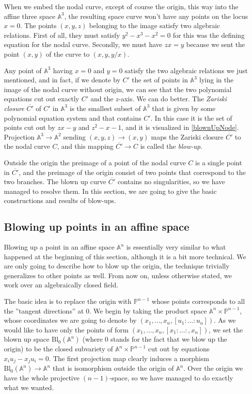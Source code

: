 \documentclass[12pt,a4paper,leqno]{article}
\newcommand{\Aff}{\mathbb{A}}
\newcommand{\Proj}{\mathbb{P}}
\newcommand{\bl}{\mathrm{Bl}}
\newcommand{\fref}[1]{\hyperref[{#1}]{\ref*{#1}}}
\theoremstyle{plain}
\theoremstyle{definition}
\theoremstyle{remark}
\begin{document}
When we embed the nodal curve, except of course the origin, this way into the affine three space $\Aff^3$, the resulting space curve won't have any points on the locus $x=0$. The points $(x,y,z)$ belonging to the image satisfy two algebraic relations. First of all, they must satisfy $y^2 - x^3 - x^2 = 0$ for this was the defining equation for the nodal curve. Secondly, we must have $zx = y$ because we sent the point $(x,y)$ of the curve to $(x,y,y/x)$.

Any point of $\Aff^3$ having $x=0$ and $y=0$ satisfy the two algebraic relations we just mentioned, and in fact, if we denote by $C'$ the set of points in $\Aff^3$ lying in the image of the nodal curve without origin, we can see that the two polynomial equations cut out exactly $C'$ and the $z$-axis. We can do better. The \emph{Zariski closure} $\overline{C'}$ of $C'$ in $\Aff^3$ is the smallest subset of $\Aff^3$ that is given by some polynomial equation system and that contains $C'$. In this case it is the set of points cut out by $zx - y$ and $z^2 - x - 1$, and it is visualized in \fref{blownUpNode}. Projection $\Aff ^3 \to \Aff^2$ sending $(x,y,z) \to (x,y)$ maps the Zariski closure $\overline{C'}$ to the nodal curve $C$, and this mapping $\overline{C'} \to C$ is called the \emph{blow-up}.

Outside the origin the preimage of a point of the nodal curve $C$ is a single point in $\overline{C'}$, and the preimage of the origin consist of two points that correspond to the two branches. The blown up curve $\overline{C'}$ contains no singularities, so we have managed to resolve them. In this section, we are going to give the basic constructions and results of blow-ups.

\subsection{Blowing up points in an affine space}

Blowing up a point in an affine space $\Aff^n$ is essentially very similar to what happened at the beginning of this section, although it is a bit more technical. We are only going to describe how to blow up the origin, the technique trivially generalizes to other points as well. From now on, unless otherwise stated, we work over an algebraically closed field.

The basic idea is to replace the origin with $\Proj^{n-1}$ whose points corresponds to all the ''tangent directions'' at 0. We begin by taking the product space $\Aff^n \times \Proj^{n-1}$, whose coordinates we are going to denote by $(x_1,...,x_n, [u_1:...:u_n])$. As we would like to have only the points of form $(x_1,...,x_n, [x_1:...:,x_n])$, we set the blown up space $\bl_0 (\Aff^n)$ (where 0 stands for the fact that we blow up the origin) to be the closed subvariety of $\Aff^n \times \Proj^{n-1}$ cut out by equations $x_i u_j - x_j u_i = 0$. The first projection map clearly induces a morphism $\bl_0 (\Aff^n) \to \Aff^n$ that is isomorphism outside the origin of $\Aff^n$. Over the origin we have the whole projective $(n-1)$-space, so we have managed to do exactly what we wanted.
\end{document}

